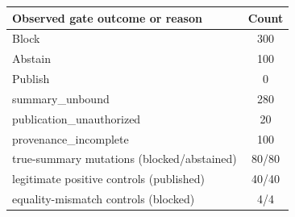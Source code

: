 \begin{tabular}{@{}lc@{}}
\toprule
Observed gate outcome or reason & Count \\
\midrule
Block & 300 \\
Abstain & 100 \\
Publish & 0 \\
\midrule
summary\_unbound & 280 \\
publication\_unauthorized & 20 \\
provenance\_incomplete & 100 \\
\midrule
true-summary mutations (blocked/abstained) & 80/80 \\
legitimate positive controls (published) & 40/40 \\
equality-mismatch controls (blocked) & 4/4 \\
\bottomrule
\end{tabular}
